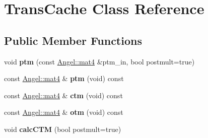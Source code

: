 \hypertarget{class_trans_cache}{\section{Trans\-Cache Class Reference}
\label{class_trans_cache}
}
\subsection*{Public Member Functions}
\begin{DoxyCompactItemize}
\item 
\hypertarget{class_trans_cache_afbb46369dfa2169eaa30fcbf0038f8b8}{void {\bfseries ptm} (const \hyperlink{class_angel_1_1mat4}{Angel\-::mat4} \&ptm\-\_\-in, bool postmult=true)}\label{class_trans_cache_afbb46369dfa2169eaa30fcbf0038f8b8}

\item 
\hypertarget{class_trans_cache_a983b90a0f35e2955beb9a619c0c85ec3}{const \hyperlink{class_angel_1_1mat4}{Angel\-::mat4} \& {\bfseries ptm} (void) const }\label{class_trans_cache_a983b90a0f35e2955beb9a619c0c85ec3}

\item 
\hypertarget{class_trans_cache_a6a1d0e8050840494441f4be6cfdb02eb}{const \hyperlink{class_angel_1_1mat4}{Angel\-::mat4} \& {\bfseries ctm} (void) const }\label{class_trans_cache_a6a1d0e8050840494441f4be6cfdb02eb}

\item 
\hypertarget{class_trans_cache_a1c24bb0902fa8b1bc9ac306d28a6e079}{const \hyperlink{class_angel_1_1mat4}{Angel\-::mat4} \& {\bfseries otm} (void) const }\label{class_trans_cache_a1c24bb0902fa8b1bc9ac306d28a6e079}

\item 
\hypertarget{class_trans_cache_af35282cc89f14b468bafd65715a60f31}{void {\bfseries calc\-C\-T\-M} (bool postmult=true)}\label{class_trans_cache_af35282cc89f14b468bafd65715a60f31}

\end{DoxyCompactItemize}
